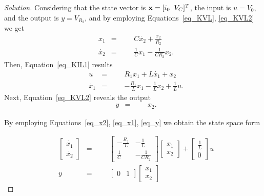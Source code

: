\documentclass[12pt]{article}
\newenvironment{solution}{\begin{proof}[Solution]}{\end{proof}}
\begin{document}
\begin{solution}
Considering that the state vector is $\textbf{x}=[i_0 \hspace{.2cm} V_C]^T$, the input is $u=V_0$, and the output is $y=V_{R_2}$, and by employing Equations~\ref{eq_KVL}, \ref{eq_KVL2} we get 
\begin{equation}\label{eq_x2}
\begin{aligned}
& x_1
& =
&&& C\dot{x_2}+\frac{x_2}{R_2}\\
& \dot{x_2}
& =
&&& \frac{1}{C}x_1-\frac{1}{CR_2}x_2.
\end{aligned}
\end{equation}
Then, Equation~\ref{eq_KIL1} results
\begin{equation}\label{eq_x1}
\begin{aligned}
& u
& =
&&& R_1x_1+L\dot{x_1}+x_2\\
& \dot{x_1}
& =
&&& -\frac{R_1}{L}x_1-\frac{1}{L}x_2+\frac{1}{L}u.
\end{aligned}
\end{equation}
Next, Equation~\ref{eq_KVL2} reveals the output
\begin{equation}\label{eq_y}
\begin{aligned}
& y
& =
&&& x_2.
\end{aligned}
\end{equation}
 
By employing Equations~\ref{eq_x2}, \ref{eq_x1}, \ref{eq_y} we obtain the state space form 

\begin{equation*}
\begin{aligned}
& \begin{bmatrix}
\dot{x_1} \\ \dot{x_2}
\end{bmatrix}
&  =
&&& \begin{bmatrix}
-\frac{R_1}{L} & -\frac{1}{L} \\
\frac{1}{C} & -\frac{1}{CR_2}
\end{bmatrix}
\begin{bmatrix}
x_1 \\
x_2
\end{bmatrix}+
\begin{bmatrix}
\frac{1}{L} \\
0
\end{bmatrix}
u\\
& y
&  =
&&& \begin{bmatrix}
0  & 1
\end{bmatrix}
\begin{bmatrix}
x_1 \\
x_2
\end{bmatrix}
\end{aligned}
\end{equation*}
\end{solution}
\end{document}
